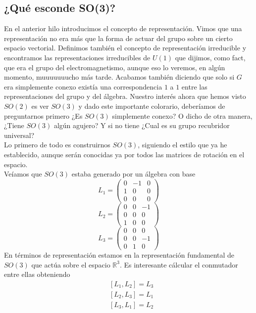 \documentclass[12pt]{article}
\begin{document}
\subsection{¿Qué esconde SO(3)?}
En el anterior hilo introducimos el concepto de representación. Vimos que una representación no era más que la forma de actuar del grupo sobre un cierto espacio vectorial. Definimos también el concepto de representación irreducible y encontramos las representaciones irreducibles de $U(1)$ que dijimos, como fact, que era el grupo del electromagnetismo, aunque eso lo veremos, en algún momento, muuuuuuucho más tarde. Acabamos también diciendo que solo si $G$ era simplemente conexo existía una correspondencia $1$ a $1$ entre las representaciones del grupo y del álgebra. Nuestro interés ahora que hemos visto $SO(2)$ es ver $SO(3)$ y dado este importante colorario, deberíamos de preguntarnos primero ¿Es $SO(3)$ simplemente conexo? O dicho de otra manera, ¿Tiene $SO(3)$ algún agujero? Y si no tiene ¿Cual es su grupo recubridor universal? \\
Lo primero de todo es construirnos $SO(3)$, siguiendo el estilo que ya he establecido, aunque serán conocidas ya por todos las matrices de rotación en el espacio.\\
Veíamos que $SO(3)$ estaba generado por un álgebra con base 
\begin{equation}
	L_1=\begin{pmatrix}
		0 & -1 & 0 \\ 1 & 0 & 0\\ 0&0&0
	\end{pmatrix}
\end{equation}
\begin{equation}
	L_2=\begin{pmatrix}
		0 & 0 & -1 \\ 0 & 0 & 0\\ 1&0&0
	\end{pmatrix}
\end{equation}
\begin{equation}
	L_3=\begin{pmatrix}
		0 & 0 & 0 \\ 0 & 0 & -1\\ 0&1&0
	\end{pmatrix}
\end{equation}
En términos de representación estamos en la representación fundamental de $SO(3)$ que actúa sobre el espacio $\mathbb{R}^3$. Es interesante cálcular el conmutador entre ellas obteniendo
\begin{equation}
    \begin{split}
        & [L_1,L_2]=L_3 \\
        & [L_2,L_3]=L_1 \\
        & [L_3,L_1]=L_2 
    \end{split}
\end{equation}
\end{document}
